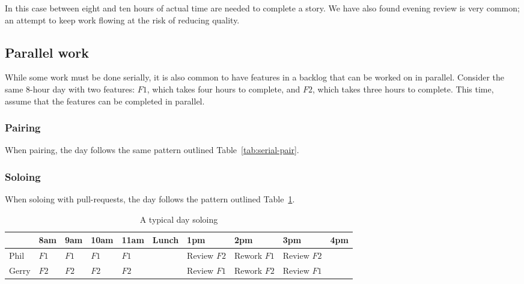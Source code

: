 \documentclass[letterpaper]{article}
\theoremstyle{definition}
\begin{document}
    In this case between eight and ten hours of actual time are needed to complete a story.
    We have also found evening review is very common;
    an attempt to keep work flowing at the risk of reducing quality.

    \subsection{Parallel work}\label{subsec:parallel-work}

    While some work must be done serially, it is also common to have features in a backlog that can be worked on in
    parallel.
    Consider the same 8-hour day with two features: $F1$, which takes four hours to complete, and
    $F2$, which takes three hours to complete.
    This time, assume that the features can be completed in parallel.

    \subsubsection{Pairing}\label{subsubsec:parallel-pairing}

    When pairing, the day follows the same pattern outlined Table~\ref{tab:serial-pair}.

    \subsubsection{Soloing}\label{subsubsec:parallel-soloing}

    When soloing with pull-requests, the day follows the pattern outlined Table~\ref{tab:parallel-solo}.

    \begin{table}[h]
        \centering
        \tiny
        \begin{tabular}{ |l|l|l|l|l|l|l|l|l|l| }
            \hline
            & 8am  & 9am  & 10am & 11am & Lunch & 1pm         & 2pm         & 3pm         & 4pm \\
            \hline
            Phil  & $F1$ & $F1$ & $F1$ & $F1$ &       & Review $F2$ & Rework $F1$ & Review $F2$ &     \\
            \hline
            Gerry & $F2$ & $F2$ & $F2$ & $F2$ &       & Review $F1$ & Rework $F2$ & Review $F1$ &     \\
            \hline
        \end{tabular}
        \caption{A typical day soloing}
        \label{tab:parallel-solo}
    \end{table}
\end{document}
